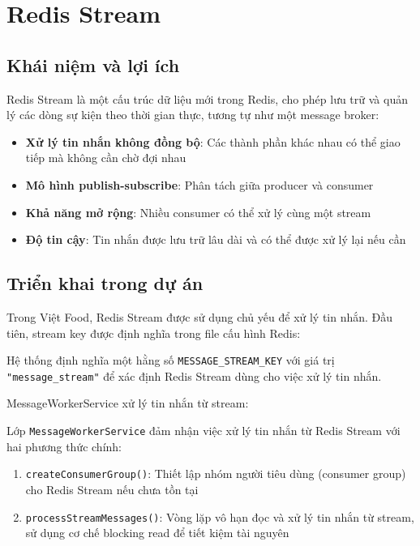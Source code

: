 \section{Redis Stream}

\subsection{Khái niệm và lợi ích}
Redis Stream là một cấu trúc dữ liệu mới trong Redis, cho phép lưu trữ và quản lý các dòng sự kiện theo thời gian thực, tương tự như một message broker:

\begin{itemize}
    \item \textbf{Xử lý tin nhắn không đồng bộ}: Các thành phần khác nhau có thể giao tiếp mà không cần chờ đợi nhau
    \item \textbf{Mô hình publish-subscribe}: Phân tách giữa producer và consumer
    \item \textbf{Khả năng mở rộng}: Nhiều consumer có thể xử lý cùng một stream
    \item \textbf{Độ tin cậy}: Tin nhắn được lưu trữ lâu dài và có thể được xử lý lại nếu cần
\end{itemize}

\subsection{Triển khai trong dự án}
Trong Việt Food, Redis Stream được sử dụng chủ yếu để xử lý tin nhắn. Đầu tiên, stream key được định nghĩa trong file cấu hình Redis:

Hệ thống định nghĩa một hằng số \texttt{MESSAGE\_STREAM\_KEY} với giá trị \texttt{"message\_stream"} để xác định Redis Stream dùng cho việc xử lý tin nhắn.

MessageWorkerService xử lý tin nhắn từ stream:

Lớp \texttt{MessageWorkerService} đảm nhận việc xử lý tin nhắn từ Redis Stream với hai phương thức chính:

\begin{enumerate}
    \item \texttt{createConsumerGroup()}: Thiết lập nhóm người tiêu dùng (consumer group) cho Redis Stream nếu chưa tồn tại
    \item \texttt{processStreamMessages()}: Vòng lặp vô hạn đọc và xử lý tin nhắn từ stream, sử dụng cơ chế blocking read để tiết kiệm tài nguyên
\end{enumerate}

